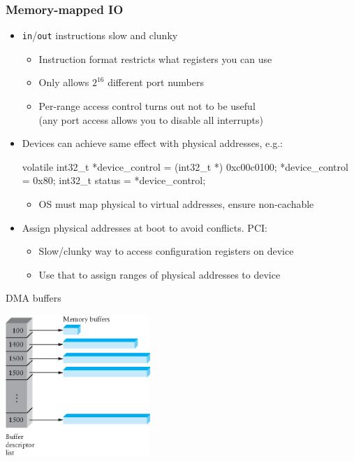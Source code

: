 \documentclass[11pt,aspectratio=169]{beamer}
\begin{document}
\begin{frame}[fragile]
\frametitle{Memory-mapped IO}
\begin{itemize}
  \item \texttt{in}/\texttt{out} instructions slow and clunky
  \begin{itemize}
    \item Instruction format restricts what registers you can use
    \item Only allows $2^{16}$ different port numbers
    \item Per-range access control turns out not to be useful \\
      (any port access allows you to disable all interrupts)
  \end{itemize}
  \item Devices can achieve same effect with physical addresses, e.g.:
\begin{ccode}
    volatile int32_t *device_control
        = (int32_t *) 0xc00c0100;
    *device_control = 0x80;
    int32_t status = *device_control;
\end{ccode}
  \begin{itemize}
    \item OS must map physical to virtual addresses, ensure
      non-cachable
  \end{itemize}
  \item Assign physical addresses at boot to avoid conflicts.  PCI:
  \begin{itemize}
    \item Slow/clunky way to access configuration registers on device
    \item Use that to assign ranges of physical addresses to device
  \end{itemize}
\end{itemize}
\end{frame}

\begin{slide}{DMA buffers}
\centerline{\includegraphics[height=2.1in]{figs/02x43}}
\end{slide}
\end{document}
